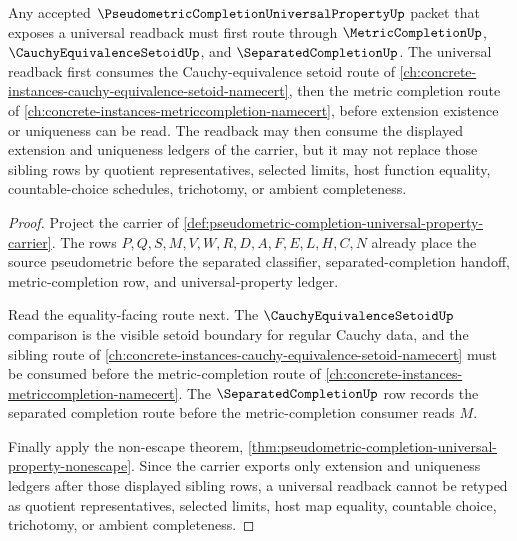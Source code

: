 \begin{theorem}
\label{thm:pseudometric-completion-sibling-route}
Any accepted $\PseudometricCompletionUniversalPropertyUp$ packet that exposes a universal readback must first route through $\MetricCompletionUp$, $\CauchyEquivalenceSetoidUp$, and $\SeparatedCompletionUp$. The universal readback first consumes the Cauchy-equivalence setoid route of \autoref{ch:concrete-instances-cauchy-equivalence-setoid-namecert}, then the metric completion route of \autoref{ch:concrete-instances-metriccompletion-namecert}, before extension existence or uniqueness can be read. The readback may then consume the displayed extension and uniqueness ledgers of the carrier, but it may not replace those sibling rows by quotient representatives, selected limits, host function equality, countable-choice schedules, trichotomy, or ambient completeness.
\end{theorem}
\begin{proof}
Project the carrier of \autoref{def:pseudometric-completion-universal-property-carrier}. The rows $P,Q,S,M,V,W,R,D,A,F,E,L,H,C,N$ already place the source pseudometric before the separated classifier, separated-completion handoff, metric-completion row, and universal-property ledger.

Read the equality-facing route next. The $\CauchyEquivalenceSetoidUp$ comparison is the visible setoid boundary for regular Cauchy data, and the sibling route of \autoref{ch:concrete-instances-cauchy-equivalence-setoid-namecert} must be consumed before the metric-completion route of \autoref{ch:concrete-instances-metriccompletion-namecert}. The $\SeparatedCompletionUp$ row records the separated completion route before the metric-completion consumer reads $M$.

Finally apply the non-escape theorem, \autoref{thm:pseudometric-completion-universal-property-nonescape}. Since the carrier exports only extension and uniqueness ledgers after those displayed sibling rows, a universal readback cannot be retyped as quotient representatives, selected limits, host map equality, countable choice, trichotomy, or ambient completeness.
\end{proof}


